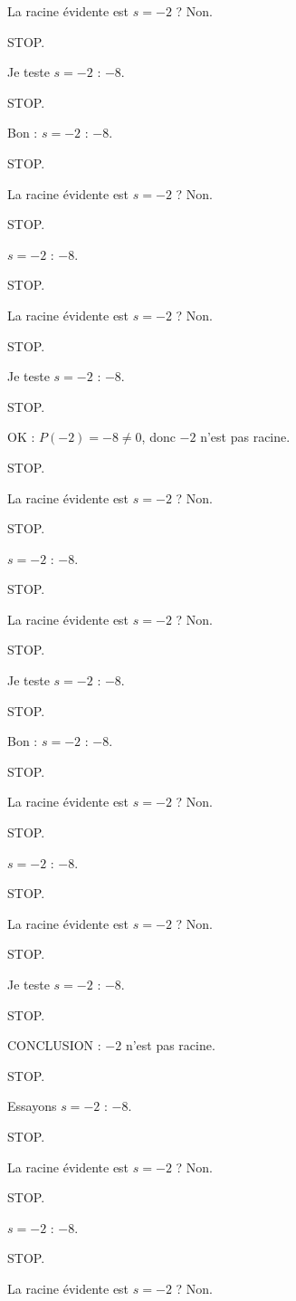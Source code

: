 \documentclass[11pt]{article}
\begin{document}
\begin{exoresolu}
\begin{enumerate}
La racine évidente est $s = -2$ ? Non. 

STOP. 

Je teste $s = -2$ : $-8$. 

STOP. 

Bon : $s = -2$ : $-8$. 

STOP. 

La racine évidente est $s = -2$ ? Non. 

STOP. 

$s = -2$ : $-8$. 

STOP. 

La racine évidente est $s = -2$ ? Non. 

STOP. 

Je teste $s = -2$ : $-8$. 

STOP. 

OK : $P(-2) = -8 \neq 0$, donc $-2$ n'est pas racine. 

STOP. 

La racine évidente est $s = -2$ ? Non. 

STOP. 

$s = -2$ : $-8$. 

STOP. 

La racine évidente est $s = -2$ ? Non. 

STOP. 

Je teste $s = -2$ : $-8$. 

STOP. 

Bon : $s = -2$ : $-8$. 

STOP. 

La racine évidente est $s = -2$ ? Non. 

STOP. 

$s = -2$ : $-8$. 

STOP. 

La racine évidente est $s = -2$ ? Non. 

STOP. 

Je teste $s = -2$ : $-8$. 

STOP. 

CONCLUSION : $-2$ n'est pas racine. 

STOP. 

Essayons $s = -2$ : $-8$. 

STOP. 

La racine évidente est $s = -2$ ? Non. 

STOP. 

$s = -2$ : $-8$. 

STOP. 

La racine évidente est $s = -2$ ? Non. 


\end{enumerate}
\end{exoresolu}
\end{document}
